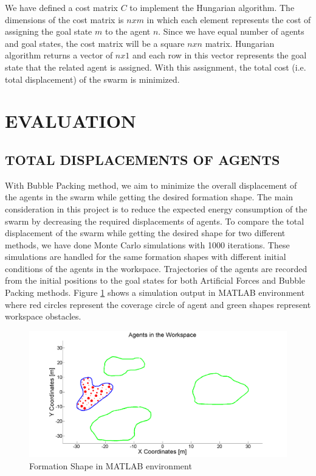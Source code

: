 \documentclass[letterpaper, 10 pt, conference]{ieeeconf}  %
\begin{document}
We have defined a cost matrix  $C$ to implement the Hungarian algorithm. The dimensions of the cost matrix is $nxm$ in which each element represents the cost of assigning the goal state $m$ to the agent $n$.  Since we have equal number of agents and goal states, the cost matrix will be a square $nxn$ matrix. Hungarian algorithm returns a vector of $nx1$ and each row in this vector represents the goal state that the related agent is assigned. With this assignment, the total cost (i.e. total displacement) of the swarm is minimized.

\section{EVALUATION} 
\subsection{TOTAL DISPLACEMENTS OF AGENTS}  \label{total_dist_ref}
		
With Bubble Packing method, we aim to minimize the overall displacement of the agents in the swarm while getting the desired formation shape. The main consideration in this project is to reduce the expected energy consumption of the swarm by decreasing the required displacements of agents. To compare the total displacement of the swarm while getting the desired shape for two different methods, we have done Monte Carlo simulations with 1000 iterations. These simulations are handled for the same formation shapes with different initial conditions of the agents in the workspace. Trajectories of the agents are recorded from the initial positions to the goal states for both Artificial Forces and Bubble Packing methods. Figure \ref{shape1_ref} shows a simulation output in MATLAB environment where red circles represent the coverage circle of agent and green shapes represent workspace obstacles.		

\begin{figure}[thpb]
\caption{Formation Shape in MATLAB environment}\label{shape1_ref}
\centerline{\includegraphics[scale = 0.17]{Trajectories_Formation_Shape_1_2}}
\end{figure} 
\end{document}
